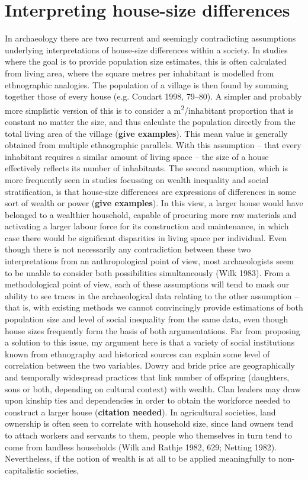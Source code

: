 \documentclass[
  12pt,
  a4paper, twoside]{book}
\begin{document}
\hypertarget{house-sizes-ethno}{%
\section{Interpreting house-size differences}\label{house-sizes-ethno}}

In archaeology there are two recurrent and seemingly contradicting assumptions underlying interpretations of house-size differences within a society. In studies where the goal is to provide population size estimates, this is often calculated from living area, where the square metres per inhabitant is modelled from ethnographic analogies. The population of a village is then found by summing together those of every house (e.g. Coudart 1998, 79--80). A simpler and probably more simplistic version of this is to consider a m\textsuperscript{2}/inhabitant proportion that is constant no matter the size, and thus calculate the population directly from the total living area of the village (\textbf{give examples}). This mean value is generally obtained from multiple ethnographic parallels. With this assumption -- that every inhabitant requires a similar amount of living space -- the size of a house effectively reflects its number of inhabitants. The second assumption, which is more frequently seen in studies focussing on wealth inequality and social stratification, is that house-size differences are expressions of differences in some sort of wealth or power (\textbf{give examples}). In this view, a larger house would have belonged to a wealthier household, capable of procuring more raw materials and activating a larger labour force for its construction and maintenance, in which case there would be significant disparities in living space per individual. Even though there is not necessarily any contradiction between these two interpretations from an anthropological point of view, most archaeologists seem to be unable to consider both possibilities simultaneously (Wilk 1983). From a methodological point of view, each of these assumptions will tend to mask our ability to see traces in the archaeological data relating to the other assumption -- that is, with existing methods we cannot convincingly provide estimations of both population size and level of social inequality from the same data, even though house sizes frequently form the basis of both argumentations. Far from proposing a solution to this issue, my argument here is that a variety of social institutions known from ethnography and historical sources can explain some level of correlation between the two variables. Dowry and bride price are geographically and temporally widespread practices that link number of offspring (daughters, sons or both, depending on cultural context) with wealth. Clan leaders may draw upon kinship ties and dependencies in order to obtain the workforce needed to construct a larger house (\textbf{citation needed}). In agricultural societies, land ownership is often seen to correlate with household size, since land owners tend to attach workers and servants to them, people who themselves in turn tend to come from landless households (Wilk and Rathje 1982, 629; Netting 1982). Nevertheless, if the notion of wealth is at all to be applied meaningfully to non-capitalistic societies, 
\end{document}
